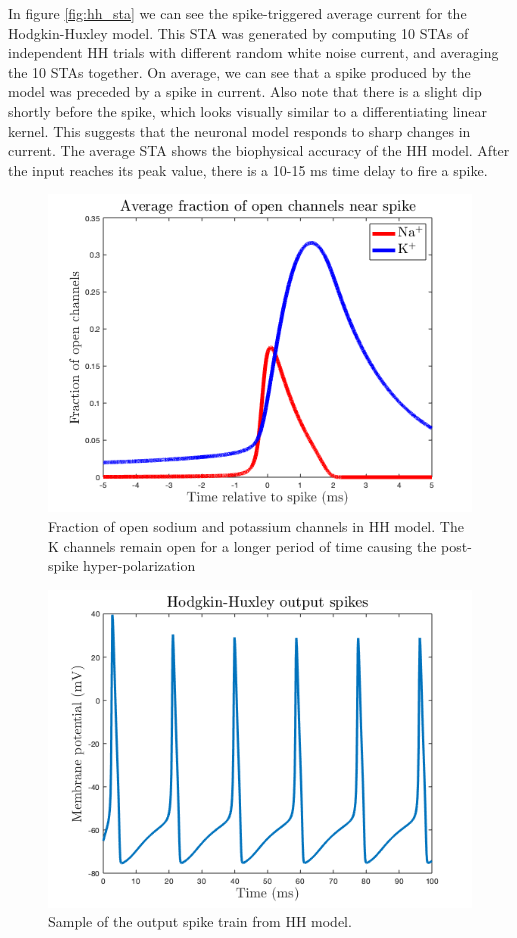\documentclass[11pt]{article}
\begin{document}
In figure \ref{fig:hh_sta} we can see the spike-triggered average current for the Hodgkin-Huxley model. This STA was generated by computing 10 STAs of independent HH trials with different random white noise current, and averaging the 10 STAs together. On average, we can see that a spike produced by the model was preceded by a spike in current. Also note that there is a slight dip shortly before the spike, which looks visually similar to a differentiating linear kernel. This suggests that the neuronal model responds to sharp changes in current. The average STA shows the biophysical accuracy of the HH model. After the input reaches its peak value, there is a 10-15 ms time delay to fire a spike.

\begin{figure}[H]
    \centering
    \includegraphics[width=4.5in]{figures/hh_fraction_channels_open.png}
    \caption{Fraction of open sodium and potassium channels in HH model. The K channels remain open for a longer period of time causing the post-spike hyper-polarization}
    \label{fig:hh_fraction_channels_open}
\end{figure}

\begin{figure}[H]
    \centering
    \includegraphics[width=4.5in]{figures/hh_spikes.png}
    \caption{Sample of the output spike train from HH model.}
    \label{fig:hh_spikes}
\end{figure}
\end{document}
